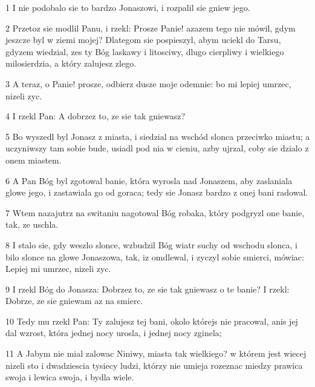 \par 1 I nie podobalo sie to bardzo Jonaszowi, i rozpalil sie gniew jego.
\par 2 Przetoz sie modlil Panu, i rzekl: Prosze Panie! azazem tego nie mówil, gdym jeszcze byl w ziemi mojej? Dlategom sie pospieszyl, abym uciekl do Tarsu, gdyzem wiedzial, zes ty Bóg laskawy i litosciwy, dlugo cierpliwy i wielkiego milosierdzia, a który zalujesz zlego.
\par 3 A teraz, o Panie! prosze, odbierz dusze moje odemnie: bo mi lepiej umrzec, nizeli zyc.
\par 4 I rzekl Pan: A dobrzez to, ze sie tak gniewasz?
\par 5 Bo wyszedl byl Jonasz z miasta, i siedzial na wschód slonca przeciwko miastu; a uczyniwszy tam sobie bude, usiadl pod nia w cieniu, azby ujrzal, coby sie dzialo z onem miastem.
\par 6 A Pan Bóg byl zgotowal banie, która wyrosla nad Jonaszem, aby zaslaniala glowe jego, i zastawiala go od goraca; tedy sie Jonasz bardzo z onej bani radowal.
\par 7 Wtem nazajutrz na switaniu nagotowal Bóg robaka, który podgryzl one banie, tak, ze uschla.
\par 8 I stalo sie, gdy weszlo slonce, wzbudzil Bóg wiatr suchy od wschodu slonca, i bilo slonce na glowe Jonaszowa, tak, iz omdlewal, i zyczyl sobie smierci, mówiac: Lepiej mi umrzec, nizeli zyc.
\par 9 I rzekl Bóg do Jonasza: Dobrzez to, ze sie tak gniewasz o te banie? I rzekl: Dobrze, ze sie gniewam az na smierc.
\par 10 Tedy mu rzekl Pan: Ty zalujesz tej bani, okolo którejs nie pracowal, anis jej dal wzrost, która jednej nocy urosla, i jednej nocy zginela;
\par 11 A Jabym nie mial zalowac Niniwy, miasta tak wielkiego? w którem jest wiecej nizeli sto i dwadziescia tysiecy ludzi, którzy nie umieja rozeznac miedzy prawica swoja i lewica swoja, i bydla wiele.


